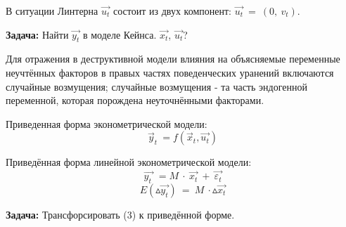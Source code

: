 \documentclass[12pt,a4paper]{article}
\begin{document}
	В ситуации Линтерна $\displaystyle \overrightarrow{u_{t}}$ состоит из двух компонент: $\displaystyle \overrightarrow{u_{t}} \ =\ ( 0,\ v_{t})$.

	\textbf{Задача:} Найти $\displaystyle \overrightarrow{y_{t}}$ в моделе Кейнса. $\displaystyle \overrightarrow{x_{t}}$, $\displaystyle \overrightarrow{u_{t}}$? 

	Для отражения в деструктивной модели влияния на объясняемые переменные неучтённых факторов в правых частях поведенческих уранений включаются случайные возмущения; случайные возмущения - та часть эндогенной переменной, которая порождена неуточнёнными факторами.

	Приведенная форма эконометрической модели:
\begin{equation}
\vec{y}_{t} \ =f\left(\vec{x}_{t} ,\overrightarrow{u_{t}}\right)
\end{equation}

	Приведённая форма линейной эконометрической модели:
\begin{equation}
\overrightarrow{y_{t} \ } \ =M\ \cdotp \ \overrightarrow{x_{t}} \ +\ \overrightarrow{\varepsilon _{t}}
\end{equation}
\begin{equation}
E\left( \vartriangle \overrightarrow{y_{t}}\right) \ =\ M\ \cdotp \vartriangle \overrightarrow{x_{t}}
\end{equation}

\textbf{Задача: }Трансфорсировать (3) к приведённой форме.
\end{document}
